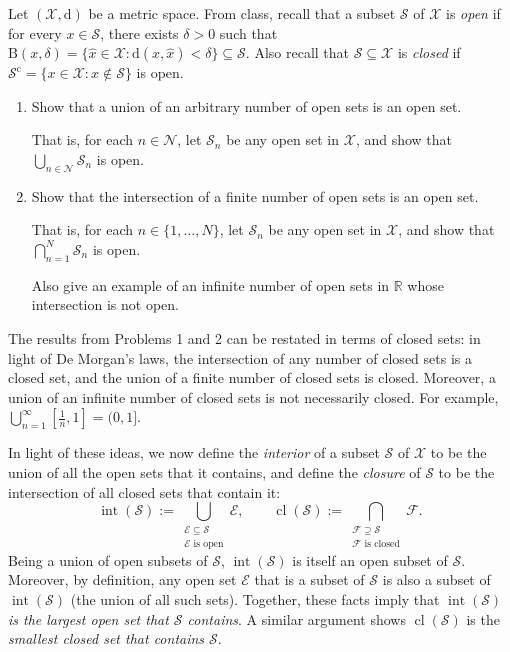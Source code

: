 \documentclass[12 pt,letterpaper]{article}
\newcommand{\bbR}{\mathbb{R}}
\newcommand{\calE}{\mathcal{E}}
\newcommand{\calF}{\mathcal{F}}
\newcommand{\calN}{\mathcal{N}}
\newcommand{\calS}{\mathcal{S}}
\newcommand{\calX}{\mathcal{X}}
\newcommand{\rmB}{\mathrm{B}}
\newcommand{\rmc}{\mathrm{c}}
\newcommand{\rmd}{\mathrm{d}}
\newcommand{\inte}{\operatorname{int}}
\newcommand{\cl}{\operatorname{cl}}
\newcommand{\set}[1]{\{{#1}\}}
\begin{document}
\noindent
Let $(\calX,\rmd)$ be a metric space.
From class, recall that a subset $\calS$ of $\calX$ is \textit{open} if for every $x\in\calS$, there exists $\delta>0$ such that
$\rmB(x,\delta)=\set{\hat{x}\in\calX: \rmd(x,\hat{x})<\delta}\subseteq\calS$.
Also recall that $\calS\subseteq\calX$ is \textit{closed} if
$\calS^\rmc=\set{x\in\calX: x\notin\calS}$ is open.

\begin{enumerate}
\item
Show that a union of an arbitrary number of open sets is an open set.

That is, for each $n\in\calN$, let $\calS_n$ be any open set in $\calX$,
and show that $\displaystyle\bigcup_{n\in\calN}\calS_n$ is open.

\item
Show that the intersection of a finite number of open sets is an open set.

That is, for each $n\in\set{1,\dotsc,N}$, let $\calS_n$ be any open set in $\calX$,
and show that $\displaystyle\bigcap_{n=1}^N\calS_n$ is open.

Also give an example of an infinite number of open sets in $\bbR$ whose intersection is not open.

\end{enumerate}

The results from Problems 1 and 2 can be restated in terms of closed sets:
in light of De Morgan's laws, the intersection of any number of closed sets is a closed set,
and the union of a finite number of closed sets is closed.
Moreover, a union of an infinite number of closed sets is not necessarily closed.
For example, $\bigcup_{n=1}^{\infty}[\tfrac1n,1]=(0,1]$.

In light of these ideas, we now define the \textit{interior} of a subset $\calS$ of $\calX$ to be the union of all the open sets that it contains,
and define the \textit{closure} of $\calS$ to be the intersection of all closed sets that contain it:
\begin{equation*}
\inte(\calS):=\bigcup_{\substack{\calE\subseteq\calS\\\calE\text{ is open}}}\calE,
\qquad
\cl(\calS):=\bigcap_{\substack{\calF\supseteq\calS\\\calF\text{ is closed}}}\calF.
\end{equation*}
Being a union of open subsets of $\calS$,
$\inte(\calS)$ is itself an open subset of $\calS$.
Moreover, by definition, any open set $\calE$ that is a subset of $\calS$ is also a subset of $\inte(\calS)$ (the union of all such sets).
Together, these facts imply that
$\inte(\calS)$ \textit{is the largest open set that $\calS$ contains}.
A similar argument shows $\cl(\calS)$ is the \textit{smallest closed set that contains $\calS$}.
\end{document}
